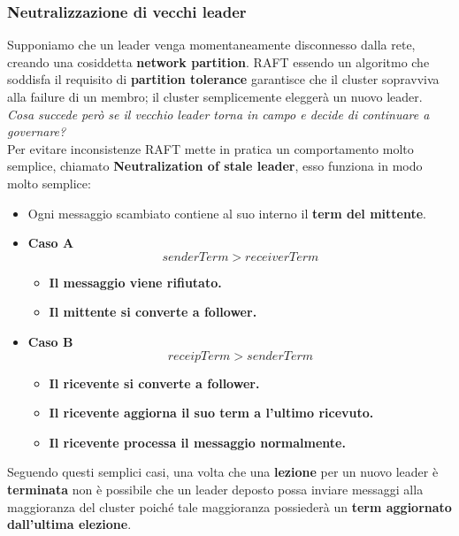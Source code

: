   \subsubsection{Neutralizzazione di vecchi leader}
  Supponiamo che un leader venga momentaneamente disconnesso dalla rete, creando una cosiddetta \textbf{network partition}. RAFT essendo un algoritmo che soddisfa il requisito di \textbf{partition tolerance} garantisce che il cluster sopravviva alla failure di un membro; il cluster semplicemente eleggerà un nuovo leader.\\
  \emph{Cosa succede però se il vecchio leader torna in campo e decide di continuare a governare?}\\
  Per evitare inconsistenze RAFT mette in pratica un comportamento molto semplice, chiamato \textbf{Neutralization of stale leader}, esso funziona in modo molto semplice:
  \begin{itemize}
    \item{Ogni messaggio scambiato contiene al suo interno il \textbf{term del mittente}}.
    \item{\textbf{Caso A}}
      \[
        senderTerm > receiverTerm
      \]
      \begin{itemize}
        \item{\textbf{Il messaggio viene rifiutato.}}
        \item{\textbf{Il mittente si converte a follower.}}
      \end{itemize}
      \item{\textbf{Caso B}}
      \[
        receipTerm > senderTerm
      \]
      \begin{itemize}
        \item{\textbf{Il ricevente si converte a follower.}}
        \item{\textbf{Il ricevente aggiorna il suo term a l'ultimo ricevuto.}}
        \item{\textbf{Il ricevente processa il messaggio normalmente.}}
      \end{itemize}
  \end{itemize}
  Seguendo questi semplici casi, una volta che una \textbf{lezione} per un nuovo leader è \textbf{terminata} non è possibile che un leader deposto possa inviare messaggi alla maggioranza del cluster poiché tale maggioranza possiederà un \textbf{term aggiornato dall'ultima elezione}.